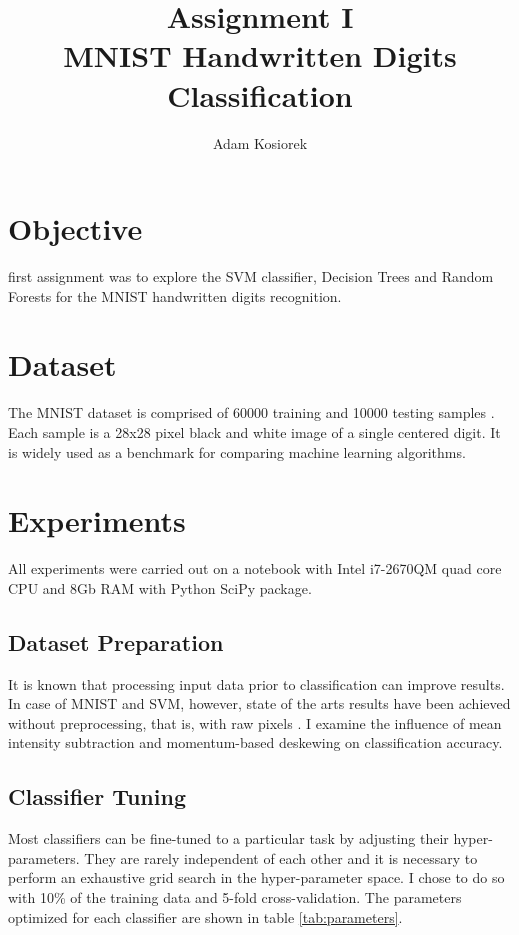 \documentclass[journal, a4paper]{IEEEtran}
\begin{document}
	\title{Assignment I\\MNIST Handwritten Digits Classification}
	\author{Adam Kosiorek}	
	\maketitle
	



\section{Objective}
     first assignment was to explore the SVM classifier, Decision Trees and Random Forests for the MNIST handwritten digits recognition. 

\section{Dataset}
    The MNIST dataset is comprised of 60000 training and 10000 testing samples \cite{MNIST}. Each sample is a 28x28 pixel black and white image of a single centered digit. It is widely used as a benchmark for comparing machine learning algorithms.	

\section{Experiments}
    All experiments were carried out on a notebook with Intel i7-2670QM quad core CPU and 8Gb RAM with Python SciPy package.
    \subsection{Dataset Preparation}
	It is known that processing input data prior to classification can improve results. In case of MNIST and SVM, however, state of the arts results have been achieved without preprocessing, that is, with raw pixels \cite{VSVM}. I examine the influence of mean intensity subtraction and momentum-based deskewing on classification accuracy.
  
    \subsection{Classifier Tuning}
	Most classifiers can be fine-tuned to a particular task by adjusting their hyper-parameters. They are rarely independent of each other and it is necessary to perform an exhaustive grid search in the hyper-parameter space. I chose to do so with 10\% of the training data and 5-fold cross-validation. The parameters optimized for each classifier are shown in table \ref{tab:parameters}. 
	
\end{document}
